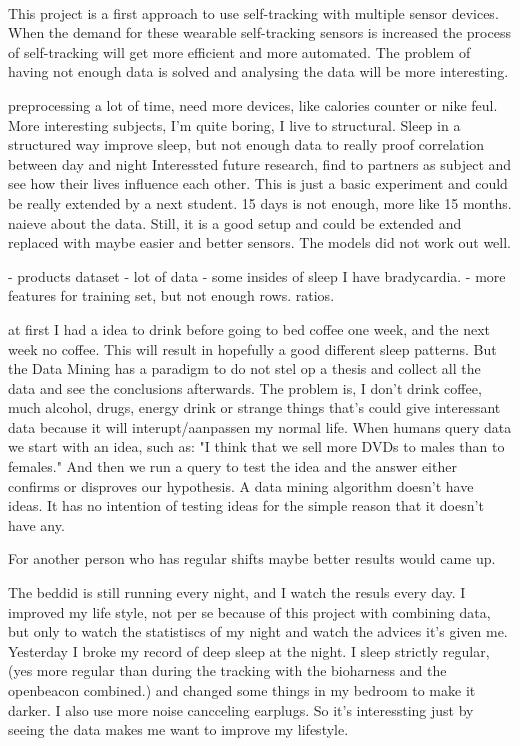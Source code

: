 	\\
	 This project is a first approach to use self-tracking with multiple sensor devices. When the demand for these wearable self-tracking sensors is increased the process of self-tracking will get more efficient and more automated. The problem of having not enough data is solved and analysing the data will be more interesting. 

	\iffalse
	preprocessing a lot of time, 
	need more devices, like calories counter or nike feul.
	More interesting subjects, I'm quite boring, I live to structural.
	Sleep in a structured way improve sleep, 
		but not enough data to really proof correlation between day and night
	Interessted future research, find to partners as subject and see how their lives influence each other.
	This is just a basic experiment and could be really extended by a next student.
	15 days is not enough, more like 15 months. 
	naieve about the data. 
	Still, it is a good setup and could be extended and replaced with maybe easier and better sensors. 
 The models did not work out well.


	- products dataset
	- lot of data
	-  some insides of sleep
	I have bradycardia. 
	- more features for training set, but not enough rows. ratios.

	at first I had a idea to drink before going to bed coffee one week, and the next week no coffee. This will result in hopefully a good different sleep patterns. But the Data Mining has a paradigm to do not stel op a thesis and collect all the data and see the conclusions afterwards. The problem is, I don't drink coffee, much alcohol, drugs, energy drink or strange things that's could give interessant data because it will interupt/aanpassen my normal life. 
When humans query data we start with an idea, such as: "I think that we sell more DVDs to males than to females." And then we run a query to test the idea and the answer either confirms or disproves our hypothesis. A data mining algorithm doesn't have ideas. It has no intention of testing ideas for the simple reason that it doesn't have any.

	For another person who has regular shifts maybe better results would came up.


	The beddid is still running every night, and I watch the resuls every day. I improved my life style, not per se because of this project with combining data, but only to watch the statistiscs of my night and watch the advices it's given me. Yesterday I broke my record of deep sleep at the night. I sleep strictly regular, (yes more regular than during the tracking with the bioharness and the openbeacon combined.) and changed some things in my bedroom to make it darker. I also use more noise cancceling earplugs. So it's interessting just by seeing the data makes me want to improve my lifestyle. 

